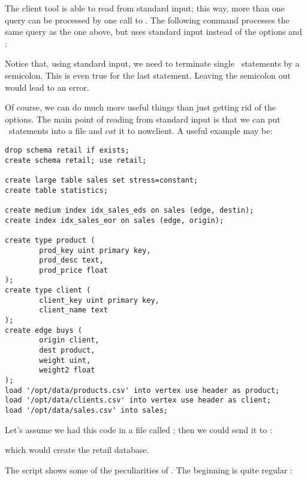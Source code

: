 The client tool is able to read from standard input;
this way, more than one query can be processed by one call
to .
The following command processes the same query as the one above,
but uses standard input instead of the options  and :


Notice that, using standard input,
we need to terminate single \sql\ statements
by a semicolon. This is even true for the last statement.
Leaving the semicolon out would lead to an error.

Of course, we can do much more useful things than just
getting rid of the options.
The main point of reading from standard input is
that we can put \sql\ statements into a file and
$cat$ it to nowclient. A useful example may be:

\begin{sqlcode}
\begin{lstlisting}
drop schema retail if exists;
create schema retail; use retail;

create large table sales set stress=constant;
create table statistics;

create medium index idx_sales_eds on sales (edge, destin);
create index idx_sales_eor on sales (edge, origin);

create type product (
        prod_key uint primary key,
        prod_desc text,
        prod_price float
);
create type client (
        client_key uint primary key,
        client_name text
);
create edge buys (
        origin client,
        dest product,
        weight uint,
        weight2 float
);
load '/opt/data/products.csv' into vertex use header as product;
load '/opt/data/clients.csv' into vertex use header as client;
load '/opt/data/sales.csv' into sales;
\end{lstlisting}
\end{sqlcode}

Let's assume we had this code in a file called
; then we could
send it to :


which would create the retail database.

The script shows some of the peculiarities of \nowdb.
The beginning is quite regular \sql:

